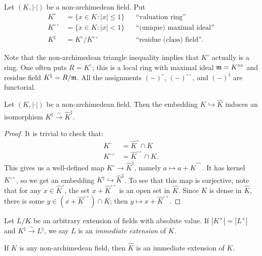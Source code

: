 \begin{definition}
Let $(K,|\cdot|)$ be a non-archimedean field. Put 
\begin{align*}
  K^\circ &= \{x\in K\colon |x|\leqslant 1\} && \text{``valuation ring''} \\
  K^{\circ\circ} &= \{x\in K\colon |x|<1\} && \text{``(unique) maximal ideal''} \\
  K^\natural &= K^\circ / K^{\circ\circ} && \text{``residue (class) field''} .
\end{align*}
\end{definition}

Note that the non-archimedean triangle inequality implies that 
$K^\circ$ actually is a ring. One often puts $R=K^\circ$; this is a local ring 
with maximal ideal $\mathfrak{m}=K^{\circ\circ}$ and residue field $K^\natural=R/\mathfrak{m}$. 
All the assignments $(-)^\circ$, $(-)^{\circ\circ}$, and $(-)^\natural$ are 
functorial. 

\begin{lemma}
Let $(K,|\cdot|)$ be a non-archimedean field. Then the embedding 
$K\hookrightarrow \widehat K$ induces an isomorphism 
$K^\natural\xrightarrow\sim\widehat K^\natural$.
\end{lemma}
\begin{proof}
It is trivial to check that: 
\begin{align*}
  K^\circ &= \widehat K^\circ\cap K \\
  K^{\circ\circ} &= \widehat K^{\circ\circ}\cap K .
\end{align*}
This gives us a well-defined map $K^\circ\to \widehat K^\natural$, namely 
$a\mapsto a+\widehat K^{\circ\circ}$. It has kernel $K^{\circ\circ}$, so we get 
an embedding $K^\natural\hookrightarrow \widehat K^\natural$. To see that this 
map is surjective, note that for any $x\in \widehat K^\circ$, the set 
$x+\widehat K^{\circ\circ}$ is an open set in $\widehat K$. Since $K$ is dense 
in $\widehat K$, there is some $y\in (x+\widehat K^{\circ\circ})\cap K$; then 
$y\mapsto x+\widehat K^{\circ\circ}$. 
\end{proof}

\begin{definition}
Let $L/K$ be an arbitrary extension of fields with absolute value. If 
$|K^\times|=|L^\times|$ and $K^\natural\xrightarrow\sim L^\natural$, we say $L$ 
is an \emph{immediate extension} of $K$.  
\end{definition}

\begin{example}
If $K$ is any non-archimedean field, then $\widehat K$ is an immediate 
extension of $K$. 
\end{example}


